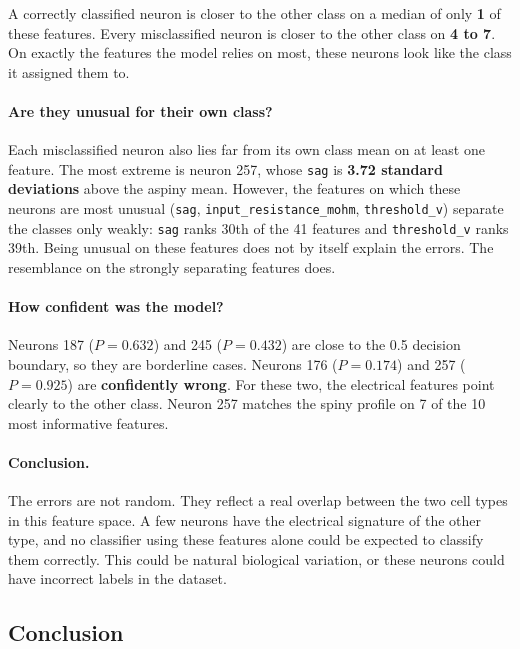 \documentclass[11pt]{article}
\begin{document}
A correctly classified neuron is closer to the other class on a median of only \textbf{1} of these features. Every misclassified neuron is closer to the other class on \textbf{4 to 7}. On exactly the features the model relies on most, these neurons look like the class it assigned them to.

\paragraph{Are they unusual for their own class?}
Each misclassified neuron also lies far from its own class mean on at least one feature. The most extreme is neuron 257, whose \texttt{sag} is \textbf{3.72 standard deviations} above the aspiny mean. However, the features on which these neurons are most unusual (\texttt{sag}, \texttt{input\_resistance\_mohm}, \texttt{threshold\_v}) separate the classes only weakly: \texttt{sag} ranks 30th of the 41 features and \texttt{threshold\_v} ranks 39th. Being unusual on these features does not by itself explain the errors. The resemblance on the strongly separating features does.

\paragraph{How confident was the model?}
Neurons 187 ($P=0.632$) and 245 ($P=0.432$) are close to the 0.5 decision boundary, so they are borderline cases. Neurons 176 ($P=0.174$) and 257 ($P=0.925$) are \textbf{confidently wrong}. For these two, the electrical features point clearly to the other class. Neuron 257 matches the spiny profile on 7 of the 10 most informative features.

\paragraph{Conclusion.}
The errors are not random. They reflect a real overlap between the two cell types in this feature space. A few neurons have the electrical signature of the other type, and no classifier using these features alone could be expected to classify them correctly. This could be natural biological variation, or these neurons could have incorrect labels in the dataset.

\FloatBarrier
\subsection{Conclusion}
\end{document}
